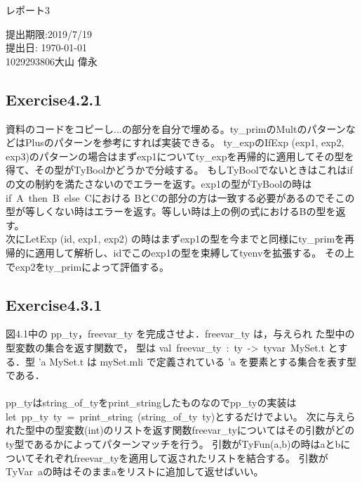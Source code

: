 \documentclass[a4paper,11pt,oneside,openany]{jsarticle}
\begin{document}
    \begin{center}

      \vspace*{35mm}
      \huge レポート3 \par
      \vspace{90mm}
      \Large 提出期限:2019/7/19\\
       提出日: \today \\
      \vspace{15mm}
      \Large
       1029293806\hspace{5mm}大山 偉永\par

      \vspace{10mm}
    \end{center}
    \clearpage
    \addtocounter{page}{-1}

    \newpage

\subsection{Exercise4.2.1}
    資料のコードをコピーし...の部分を自分で埋める。ty\_primのMultのパターンなどはPlusのパターンを参考にすれば実装できる。
    ty\_expのIfExp (exp1, exp2, exp3)のパターンの場合はまずexp1についてty_expを再帰的に適用してその型を得て、その型がTyBoolかどうかで分岐する。
    もしTyBoolでないときはこれはifの文の制約を満たさないのでエラーを返す。exp1の型がTyBoolの時はif\ A\ then\ B\ else\ Cにおける
    BとCの部分の方は一致する必要があるのでそこの型が等しくない時はエラーを返す。等しい時は上の例の式におけるBの型を返す。\\
    次にLetExp (id, exp1, exp2) の時はまずexp1の型を今までと同様にty\_primを再帰的に適用して解析し、idでこのexp1の型を束縛してtyenvを拡張する。
    その上でexp2をty\_primによって評価する。    

    

\subsection{Exercise4.3.1}
図4.1中の pp\_ty，freevar\_ty を完成させよ．freevar\_ty は，与えられ た型中の型変数の集合を返す関数で，
型は val\ freevar\_ty\ :\ ty\ ->\ tyvar\ MySet.t とする．型 'a MySet.t は mySet.mli で定義されている 'a を要素とする集合を表す型である．\\\\ 
    pp\_tyはstring\_of\_tyをprint\_stringしたものなのでpp\_tyの実装はlet\ pp\_ty\ ty\  =\ print\_string\  (string\_of\_ty\ ty)とするだけでよい。
    次に与えられた型中の型変数(int)のリストを返す関数freevar\_tyについてはその引数がどのty型であるかによってパターンマッチを行う。
    引数がTyFun(a,b)の時はaとbについてそれぞれfreevar\_tyを適用して返されたリストを結合する。
    引数がTyVar\ aの時はそのままaをリストに追加して返せばいい。
   
\end{document}
